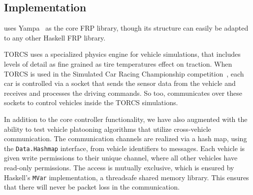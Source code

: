 \subsection{Implementation} 

\mbox{\ourLib} uses Yampa~\cite{courtney2003yampa} as the core FRP library, though its structure can easily be adapted to any other Haskell FRP library.

TORCS uses a specialized physics engine for vehicle simulations, that includes levels of detail as fine grained as tire temperatures effect on traction. 
When TORCS is used in the Simulated Car Racing Championship competition~\cite{SCRC}, each car is controlled via a socket that sends the sensor data from the vehicle and receives and processes the driving commands.
So too, \ourLib communicates over these sockets to control vehicles inside the TORCS simulations.

In addition to the core controller functionality, we have also augmented \ourLib with the ability to test vehicle platooning algorithms that utilize cross-vehicle communication.
The communication channels are realized via a hash map, using the \texttt{Data.Hashmap} interface, from vehicle identifiers to messages.
Each vehicle is given write permissions to their unique channel, where all other vehicles have read-only permissions.
The access is mutually exclusive, which is ensured by Haskell's \texttt{MVar} implementation, a threadsafe shared memory library.
This ensures that there will never be packet loss in the communication.
 
